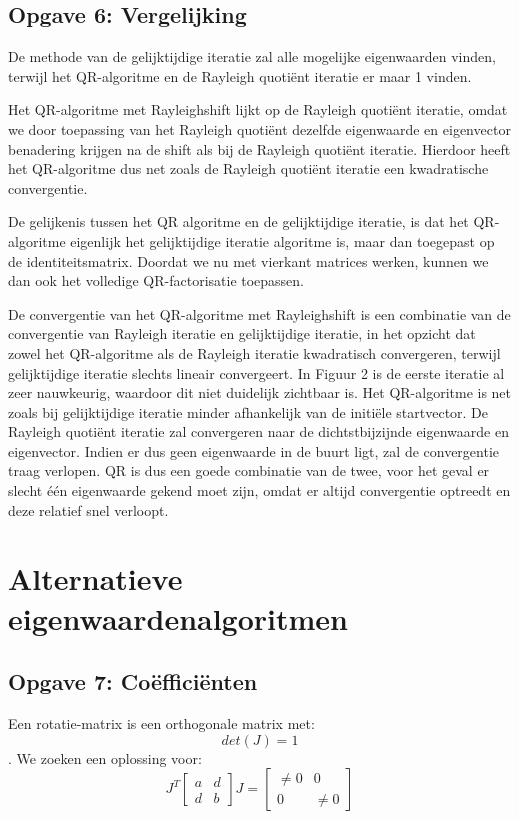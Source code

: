 \documentclass[a4paper]{article}
\newcommand{\opgave}[1]{\subsection{Opgave #1}}
\begin{document}
\opgave{6: Vergelijking}\label{sec:oef6}

De methode van de gelijktijdige iteratie zal alle mogelijke eigenwaarden vinden, terwijl het 	 QR-algoritme en de Rayleigh quoti\"ent iteratie er maar 1 vinden. \par\noindent 
    Het QR-algoritme met Rayleighshift lijkt op de Rayleigh quoti\"ent iteratie, omdat we door 		toepassing van het Rayleigh quoti\"ent dezelfde eigenwaarde en eigenvector benadering krijgen 	  na de shift als bij de Rayleigh quoti\"ent iteratie. Hierdoor heeft het QR-algoritme dus net 		zoals de Rayleigh quoti\"ent iteratie een kwadratische convergentie. \par\noindent
    De gelijkenis tussen het QR algoritme en de gelijktijdige iteratie, is dat het QR-algoritme 	eigenlijk het gelijktijdige iteratie algoritme is, maar dan toegepast op de identiteitsmatrix. 	   Doordat we nu met vierkant matrices werken, kunnen we dan ook het volledige QR-factorisatie 		toepassen.
    \\ \par\noindent
    De convergentie van het QR-algoritme met Rayleighshift is een combinatie van de convergentie 	 van Rayleigh iteratie en gelijktijdige iteratie, in het opzicht dat zowel het QR-algoritme als 	de Rayleigh iteratie kwadratisch convergeren, terwijl gelijktijdige iteratie slechts lineair 	 convergeert. In Figuur 2 is de eerste iteratie al zeer nauwkeurig, waardoor dit niet duidelijk 	zichtbaar is. Het QR-algoritme is net zoals bij gelijktijdige iteratie minder afhankelijk van 	  de initi\"ele startvector. De Rayleigh quoti\"ent iteratie zal convergeren naar de 				dichtstbijzijnde eigenwaarde en eigenvector. Indien er dus geen eigenwaarde in de buurt ligt, 	  zal de convergentie traag verlopen. QR is dus een goede combinatie van de twee, voor het geval 	 er slecht \'e\'en eigenwaarde gekend moet zijn, omdat er altijd convergentie optreedt en deze 		relatief snel verloopt.
\newpage

\section{Alternatieve eigenwaardenalgoritmen}\label{sec:alternatief}

\opgave{7: Co\"effici\"enten}\label{sec:oef7}

Een rotatie-matrix is een orthogonale matrix met: 
\begin{equation} \label{eq:rot-matrix}
det(J)=1
\end{equation}.
We zoeken een oplossing voor: 
\begin{equation} \label{eq:jacobi}
J^T 
\begin{bmatrix} a & d \\ d & b \end{bmatrix} 
J = 
\begin{bmatrix}\ne{0} & 0 \\ 0 & \ne{0}\end{bmatrix}
\end{equation}
\end{document}
